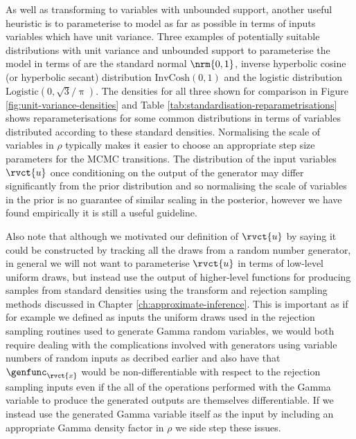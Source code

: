 As well as transforming to variables with unbounded support, another useful heuristic is to parameterise to model as far as possible in terms of inputs variables which have unit variance. Three examples of potentially suitable distributions with unit variance and unbounded support to parameterise the model in terms of are the standard normal $\nrm{0,1}$, inverse hyperbolic cosine (or hyperbolic secant) distribution $\textrm{InvCosh}(0,1)$ and the logistic distribution $\textrm{Logistic}(0,\sqrt{3}/\uppi)$. The densities for all three shown for comparison in Figure \ref{fig:unit-variance-densities} and Table \ref{tab:standardisation-reparametrisations} shows reparameterisations for some common distributions in terms of variables distributed according to these standard densities. Normalising the scale of variables in $\rho$ typically makes it easier to choose an appropriate step size parameters for the \ac{MCMC} transitions. The distribution of the input variables $\rvct{u}$ once conditioning on the output of the generator may differ significantly from the prior distribution and so normalising the scale of variables in the prior is no guarantee of similar scaling in the posterior, however we have found empirically it is still a useful guideline.%

Also note that although we motivated our definition of $\rvct{u}$ by saying it could be constructed by tracking all the draws from a random number generator, in general we will not want to parameterise $\rvct{u}$ in terms of low-level uniform draws, but instead use the output of higher-level functions for producing samples from standard densities using the transform and rejection sampling methods discussed in Chapter \ref{ch:approximate-inference}. This is important as if for example we defined as inputs the uniform draws used in the rejection sampling routines used to generate Gamma random variables, we would both require dealing with the complications involved with generators using variable numbers of random inputs as decribed earlier and also have that $\genfunc_{\rvct{x}}$ would be non-differentiable with respect to the rejection sampling inputs even if the all of the operations performed with the Gamma variable to produce the generated outputs are themselves differentiable. If we instead use the generated Gamma variable itself as the input by including an appropriate Gamma density factor in $\rho$ we side step these issues. 

